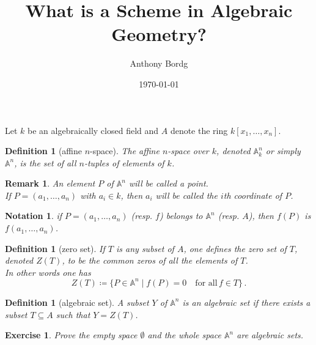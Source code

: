 \documentclass[12pt]{article}
\newtheorem{definition}[proposition]{Definition}
\newtheorem{remark}[proposition]{Remark}
\newtheorem{ex}[proposition]{Exercise}
\newtheorem{notation}{Notation}
\begin{document}
	
\title{What is a Scheme in Algebraic Geometry?}
\author{Anthony Bordg}
\date{\today}
\maketitle

\begin{abstract}
\end{abstract}
	
Let $k$ be an algebraically closed field and $A$ denote the ring $k \left[ x_1, \dots, x_n \right]$. \\

\begin{definition}[affine $n$-space] 
	The affine $n$-space over $k$, denoted $\mathbb{A}^n_k$ or simply $\mathbb{A}^n$, is the set of all $n$-tuples of elements of $k$.  
\end{definition}

\begin{remark}
	An element $P$ of $\mathbb{A}^n$ will be called a point. \\
	If $P = (a_1, \dots, a_n)$ with $a_i \in k$, then $a_i$ will be called the $i$th coordinate of $P$.
\end{remark}

\begin{notation}
	if $P = (a_1, \dots, a_n)$ (\textit{resp.} $f$) belongs to $\mathbb{A}^n$ (\textit{resp.} $A$), then $f(P)$ is $f(a_1, \dots, a_n)$.
\end{notation}		

\begin{definition}[zero set]
	If $T$ is any subset of $A$, one defines the zero set of $T$, denoted $Z(T)$, to be the common zeros of all the elements of $T$. \\
	In other words one has
	\[
	Z(T) \coloneqq \lbrace P \in \mathbb{A}^n \mid f(P) = 0 \quad \text{for all}\, f \in T \rbrace \, . 
	\]
\end{definition}

\begin{definition}[algebraic set]
	A subset $Y$ of $\mathbb{A}^n$ is an algebraic set if there exists a subset $T \subseteq A$ such that $Y = Z(T)$. 
\end{definition}

\begin{ex}
	Prove the empty space $\emptyset$ and the whole space $\mathbb{A}^n$ are algebraic sets.
\end{ex}
\end{document}
